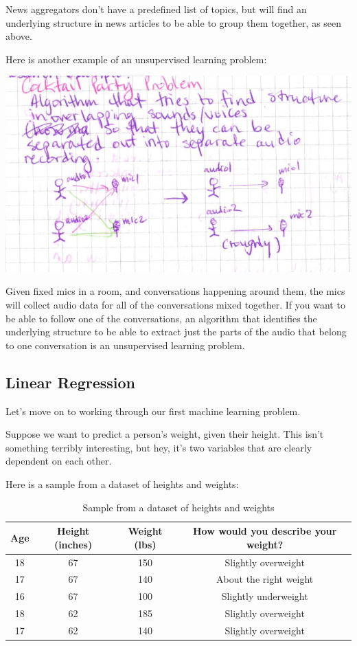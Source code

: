 \documentclass[12pt]{article}
\begin{document}
News aggregators don't have a predefined list of topics, but will find an underlying structure in news articles to be able to group them together, as seen above. 

Here is another example of an unsupervised learning problem:

\includegraphics[width={\textwidth}]{cocktail-party}

Given fixed mics in a room, and conversations happening around them, the mics will collect audio data for all of the conversations mixed together. If you want to be able to follow one of the conversations, an algorithm that identifies the underlying structure to be able to extract just the parts of the audio that belong to one conversation is an unsupervised learning problem.

\subsection{Linear Regression}
Let's move on to working through our first machine learning problem.

Suppose we want to predict a person's weight, given their height. This isn't something terribly interesting, but hey, it's two variables that are clearly dependent on each other.

Here is a sample from a dataset of heights and weights:
\begin{table}[htp]
\caption{Sample from a dataset of heights and weights}
\begin{center}
\begin{tabular}{|c|c|c|c|}
\hline
Age & Height (inches) & Weight (lbs) & How would you describe your weight? \\ \hline
18 & 67 & 150 & Slightly overweight \\
17 & 67 & 140 & About the right weight \\
16 & 67 & 100 & Slightly underweight \\
18 & 62 & 185 & Slightly overweight \\
17 & 62 & 140 & Slightly overweight \\
\hline
\end{tabular}
\end{center}
\label{table:height-weight-sample-table}
\end{table}%
\end{document}
